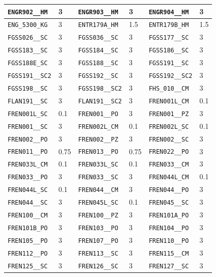 \begin{longtable}{|l|l||l|l||l|l|}
    \verb|ENGR902__HM| & 3 & \verb|ENGR903__HM| & 3 & \verb|ENGR904__HM| & 3\\\hline
    \verb|ENG_5300_KG| & 3 & \verb|ENTR179A_HM| & 1.5 & \verb|ENTR179B_HM| & 1.5\\\hline
    \verb|FGSS026__SC| & 3 & \verb|FGSS036__SC| & 3 & \verb|FGSS177__SC| & 3\\\hline
    \verb|FGSS183__SC| & 3 & \verb|FGSS184__SC| & 3 & \verb|FGSS186__SC| & 3\\\hline
    \verb|FGSS188E_SC| & 3 & \verb|FGSS188__SC| & 3 & \verb|FGSS191__SC| & 3\\\hline
    \verb|FGSS191__SC2| & 3 & \verb|FGSS192__SC| & 3 & \verb|FGSS192__SC2| & 3\\\hline
    \verb|FGSS198__SC| & 3 & \verb|FGSS198__SC2| & 3 & \verb|FHS_010__CM| & 3\\\hline
    \verb|FLAN191__SC| & 3 & \verb|FLAN191__SC2| & 3 & \verb|FREN001L_CM| & 0.1\\\hline
    \verb|FREN001L_SC| & 0.1 & \verb|FREN001__PO| & 3 & \verb|FREN001__PZ| & 3\\\hline
    \verb|FREN001__SC| & 3 & \verb|FREN002L_CM| & 0.1 & \verb|FREN002L_SC| & 0.1\\\hline
    \verb|FREN002__PO| & 3 & \verb|FREN002__PZ| & 3 & \verb|FREN002__SC| & 3\\\hline
    \verb|FREN011__PO| & 0.75 & \verb|FREN013__PO| & 0.75 & \verb|FREN022__PO| & 3\\\hline
    \verb|FREN033L_CM| & 0.1 & \verb|FREN033L_SC| & 0.1 & \verb|FREN033__CM| & 3\\\hline
    \verb|FREN033__PO| & 3 & \verb|FREN033__SC| & 3 & \verb|FREN044L_CM| & 0.1\\\hline
    \verb|FREN044L_SC| & 0.1 & \verb|FREN044__CM| & 3 & \verb|FREN044__PO| & 3\\\hline
    \verb|FREN044__SC| & 3 & \verb|FREN045L_SC| & 0.1 & \verb|FREN045__SC| & 3\\\hline
    \verb|FREN100__CM| & 3 & \verb|FREN100__PZ| & 3 & \verb|FREN101A_PO| & 3\\\hline
    \verb|FREN101B_PO| & 3 & \verb|FREN103__PO| & 3 & \verb|FREN104__PO| & 3\\\hline
    \verb|FREN105__PO| & 3 & \verb|FREN107__PO| & 3 & \verb|FREN110__PO| & 3\\\hline
    \verb|FREN112__PO| & 3 & \verb|FREN113__SC| & 3 & \verb|FREN115__CM| & 3\\\hline
    \verb|FREN125__SC| & 3 & \verb|FREN126__SC| & 3 & \verb|FREN127__SC| & 3\\\hline

\end{longtable}
